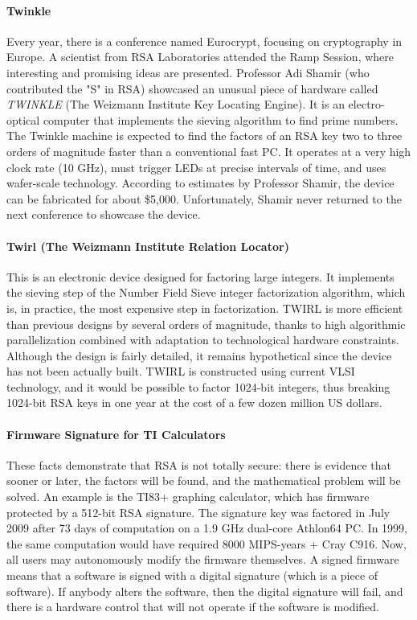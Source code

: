 \paragraph*{Twinkle}
Every year, there is a conference named Eurocrypt, focusing on cryptography in Europe. A scientist from RSA Laboratories attended the Ramp Session, where interesting and promising ideas are presented. Professor Adi Shamir (who contributed the "S" in RSA) showcased an unusual piece of hardware called \textit{TWINKLE} (The Weizmann Institute Key Locating Engine). It is an electro-optical computer that implements the sieving algorithm to find prime numbers. The Twinkle machine is expected to find the factors of an RSA key two to three orders of magnitude faster than a conventional fast PC. It operates at a very high clock rate (10 GHz), must trigger LEDs at precise intervals of time, and uses wafer-scale technology. According to estimates by Professor Shamir, the device can be fabricated for about \$5,000. Unfortunately, Shamir never returned to the next conference to showcase the device.

\paragraph*{Twirl (The Weizmann Institute Relation Locator)}
This is an electronic device designed for factoring large integers. It implements the sieving step of the Number Field Sieve integer factorization algorithm, which is, in practice, the most expensive step in factorization. TWIRL is more efficient than previous designs by several orders of magnitude, thanks to high algorithmic parallelization combined with adaptation to technological hardware constraints. Although the design is fairly detailed, it remains hypothetical since the device has not been actually built. TWIRL is constructed using current VLSI technology, and it would be possible to factor 1024-bit integers, thus breaking 1024-bit RSA keys in one year at the cost of a few dozen million US dollars.


\paragraph*{Firmware Signature for TI Calculators}
These facts demonstrate that RSA is not totally secure: there is evidence that sooner or later, the factors will be found, and the mathematical problem will be solved. An example is the TI83+ graphing calculator, which has firmware protected by a 512-bit RSA signature. The signature key was factored in July 2009 after 73 days of computation on a 1.9 GHz dual-core Athlon64 PC. In 1999, the same computation would have required 8000 MIPS-years + Cray C916. Now, all users may autonomously modify the firmware themselves. A signed firmware means that a software is signed with a digital signature (which is a piece of software). If anybody alters the software, then the digital signature will fail, and there is a hardware control that will not operate if the software is modified.



